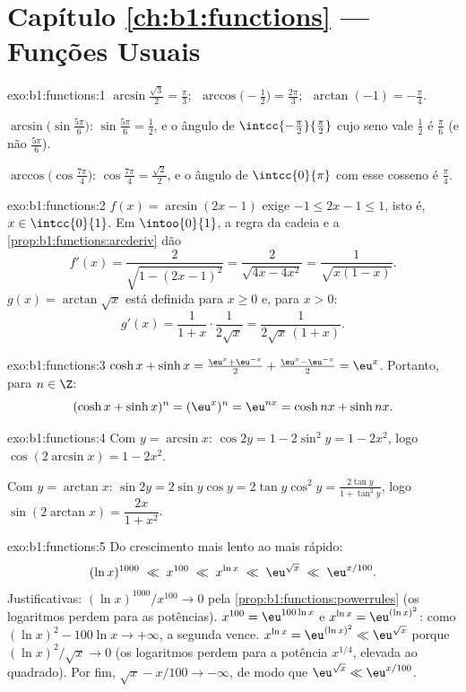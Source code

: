 \section*{Capítulo \ref{ch:b1:functions} --- Funções Usuais}

\begin{solution}{exo:b1:functions:1}
$\arcsin\frac{\sqrt 3}{2} = \frac\pi3$;
$\;\arccos\bigl(-\frac12\bigr) = \frac{2\pi}{3}$;
$\;\arctan(-1) = -\frac\pi4$.

$\arcsin\bigl(\sin\frac{5\pi}{6}\bigr)$: $\sin\frac{5\pi}{6} =
\frac12$, e o ângulo de $\intcc{-\frac\pi2}{\frac\pi2}$ cujo seno vale
$\frac12$ é $\frac\pi6$ (e não $\frac{5\pi}{6}$).

$\arccos\bigl(\cos\frac{7\pi}{4}\bigr)$: $\cos\frac{7\pi}{4} =
\frac{\sqrt 2}{2}$, e o ângulo de $\intcc{0}{\pi}$ com esse cosseno
é $\frac\pi4$.
\end{solution}

\begin{solution}{exo:b1:functions:2}
$f(x) = \arcsin(2x - 1)$ exige $-1 \leq 2x - 1 \leq 1$, isto é, $x
\in \intcc{0}{1}$. Em $\intoo{0}{1}$, a regra da cadeia e a
\cref{prop:b1:functions:arcderiv} dão
\[
f'(x) = \frac{2}{\sqrt{1 - (2x-1)^2}} = \frac{2}{\sqrt{4x - 4x^2}}
= \frac{1}{\sqrt{x(1 - x)}} .
\]
$g(x) = \arctan\sqrt x$ está definida para $x \geq 0$ e, para $x > 0$:
\[
g'(x) = \frac{1}{1 + x} \cdot \frac{1}{2\sqrt x}
= \frac{1}{2\sqrt x\,(1 + x)} .
\]
\end{solution}

\begin{solution}{exo:b1:functions:3}
$\cosh x + \sinh x = \frac{\eu^x + \eu^{-x}}{2} + \frac{\eu^x -
\eu^{-x}}{2} = \eu^x$. Portanto, para $n \in \Z$:
\[
(\cosh x + \sinh x)^n = (\eu^x)^n = \eu^{nx}
= \cosh nx + \sinh nx .
\]
\end{solution}

\begin{solution}{exo:b1:functions:4}
Com $y = \arcsin x$: $\cos 2y = 1 - 2\sin^2 y = 1 - 2x^2$, logo
$\cos(2\arcsin x) = 1 - 2x^2$.

Com $y = \arctan x$: $\sin 2y = 2 \sin y \cos y = 2 \tan y \cos^2 y =
\frac{2\tan y}{1 + \tan^2 y}$, logo $\sin(2\arctan x) =
\dfrac{2x}{1 + x^2}$.
\end{solution}

\begin{solution}{exo:b1:functions:5}
Do crescimento mais lento ao mais rápido:
\[
(\ln x)^{1000} \;\ll\; x^{100} \;\ll\; x^{\ln x} \;\ll\;
\eu^{\sqrt x} \;\ll\; \eu^{x/100} .
\]
Justificativas: $(\ln x)^{1000}/x^{100} \to 0$ pela
\cref{prop:b1:functions:powerrules} (os logaritmos perdem para as potências).
$x^{100} = \eu^{100\ln x}$ e $x^{\ln x} = \eu^{(\ln x)^2}$: como
$(\ln x)^2 - 100\ln x \to +\infty$, a segunda vence. $x^{\ln x} =
\eu^{(\ln x)^2} \ll \eu^{\sqrt x}$ porque $(\ln x)^2/\sqrt x \to 0$
(os logaritmos perdem para a potência $x^{1/4}$, elevada ao quadrado).
Por fim, $\sqrt x - x/100
\to -\infty$, de modo que $\eu^{\sqrt x} \ll \eu^{x/100}$.
\end{solution}

